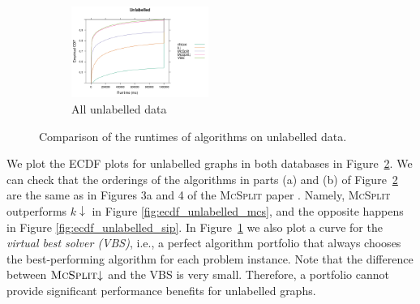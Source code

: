 \documentclass{l4proj}
\theoremstyle{definition}
\theoremstyle{remark}
\begin{document}
\begin{figure}
\begin{subfigure}[t]{\textwidth}
    \centering
    \includegraphics[width=0.49\textwidth]{images/ecdf_unlabelled.png}
    \caption{All unlabelled data}
    \label{fig:ecdf_unlabelled_both}
  \end{subfigure}
  \caption{Comparison of the runtimes of algorithms on unlabelled data.}
  \label{fig:ecdf_unlabelled}
\end{figure}

We plot the ECDF plots for unlabelled graphs in both databases in
Figure~\ref{fig:ecdf_unlabelled}. We can check that the orderings of the
algorithms in parts (a) and (b) of Figure~\ref{fig:ecdf_unlabelled} are the same
as in Figures 3a and 4 of the \textsc{McSplit} paper
\cite{DBLP:conf/ijcai/McCreeshPT17}. Namely, \textsc{McSplit} outperforms
$k{\downarrow}$ in Figure \ref{fig:ecdf_unlabelled_mcs}, and the opposite
happens in Figure \ref{fig:ecdf_unlabelled_sip}. In
Figure~\ref{fig:ecdf_unlabelled_both} we also plot a curve for the \emph{virtual
  best solver (VBS)}, i.e., a perfect algorithm portfolio that always chooses
the best-performing algorithm for each problem instance. Note that the
difference between $\textsc{McSplit}{\downarrow}$ and the VBS is very small.
Therefore, a portfolio cannot provide significant performance benefits for
unlabelled graphs.
\end{document}
